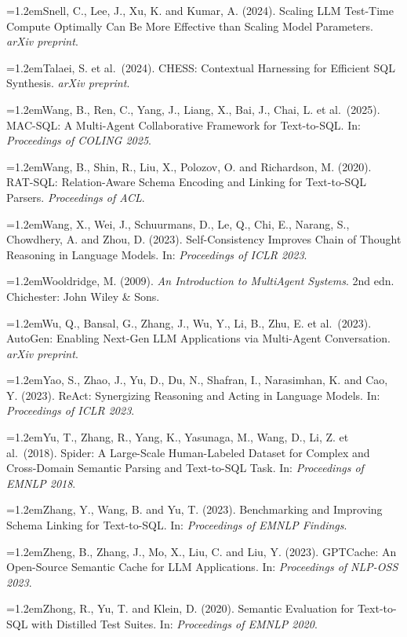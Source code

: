 \documentclass[conference]{IEEEtran}
\newcommand{\refentry}{\par\noindent\hangindent=1.2em\hangafter=1}
\begin{document}
\refentry Snell, C., Lee, J., Xu, K. and Kumar, A. (2024). Scaling LLM
Test-Time Compute Optimally Can Be More Effective than Scaling Model
Parameters. \emph{arXiv preprint}.

\refentry Talaei, S. et al.~(2024). CHESS: Contextual Harnessing for
Efficient SQL Synthesis. \emph{arXiv preprint}.

\refentry Wang, B., Ren, C., Yang, J., Liang, X., Bai, J., Chai, L. et
al.~(2025). MAC-SQL: A Multi-Agent Collaborative Framework for Text-to-SQL.
In: \emph{Proceedings of COLING 2025}.

\refentry Wang, B., Shin, R., Liu, X., Polozov, O. and Richardson, M. (2020).
RAT-SQL: Relation-Aware Schema Encoding and Linking for Text-to-SQL Parsers.
\emph{Proceedings of ACL}.

\refentry Wang, X., Wei, J., Schuurmans, D., Le, Q., Chi, E., Narang, S.,
Chowdhery, A. and Zhou, D. (2023). Self-Consistency Improves Chain of Thought
Reasoning in Language Models. In: \emph{Proceedings of ICLR 2023}.

\refentry Wooldridge, M. (2009). \emph{An Introduction to MultiAgent Systems}.
2nd edn. Chichester: John Wiley \& Sons.

\refentry Wu, Q., Bansal, G., Zhang, J., Wu, Y., Li, B., Zhu, E. et al.~(2023).
AutoGen: Enabling Next-Gen LLM Applications via Multi-Agent Conversation.
\emph{arXiv preprint}.

\refentry Yao, S., Zhao, J., Yu, D., Du, N., Shafran, I., Narasimhan, K. and
Cao, Y. (2023). ReAct: Synergizing Reasoning and Acting in Language Models.
In: \emph{Proceedings of ICLR 2023}.

\refentry Yu, T., Zhang, R., Yang, K., Yasunaga, M., Wang, D., Li, Z. et
al.~(2018). Spider: A Large-Scale Human-Labeled Dataset for Complex and
Cross-Domain Semantic Parsing and Text-to-SQL Task. In: \emph{Proceedings of
EMNLP 2018}.

\refentry Zhang, Y., Wang, B. and Yu, T. (2023). Benchmarking and Improving
Schema Linking for Text-to-SQL. In: \emph{Proceedings of EMNLP Findings}.

\refentry Zheng, B., Zhang, J., Mo, X., Liu, C. and Liu, Y. (2023). GPTCache:
An Open-Source Semantic Cache for LLM Applications. In: \emph{Proceedings of
NLP-OSS 2023}.

\refentry Zhong, R., Yu, T. and Klein, D. (2020). Semantic Evaluation for
Text-to-SQL with Distilled Test Suites. In: \emph{Proceedings of EMNLP 2020}.

\endgroup
\end{document}
